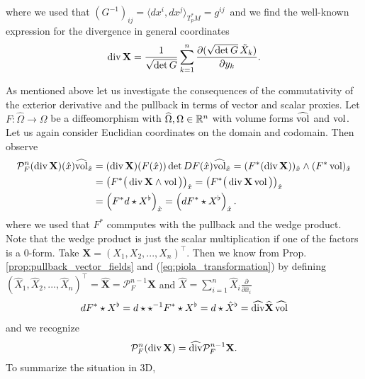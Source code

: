\documentclass[../main.tex]{subfiles}
\begin{document}
where we used that $(G^{-1})_{ij} = \langle dx^i, dx^j \rangle_{T^*_p M} = g^{ij}$\
and we find the well-known expression for the divergence in general coordinates
\begin{align*}
    \operatorname{div} \mathbf{X} = \frac{1}{\sqrt{ \det G}} \sum_{k=1}^n 
        \frac{\partial (\sqrt{ \det G} \, \tilde{X}_k )}{\partial y_k}.
\end{align*}

As mentioned above let us investigate the consequences of the 
commutativity of the exterior derivative and the pullback in terms 
of vector and scalar proxies.
Let $F: \widehat{\Omega} \rightarrow \Omega$ be a diffeomorphism with 
$\widehat{\Omega}, \Omega \in \mathbb{R}^n$ with volume forms $\widehat{\operatorname{vol}}$ and 
$\operatorname{vol}$. Let us again consider Euclidian 
coordinates on the domain and codomain. Then observe
\begin{align*}
    \mathcal{P}^n_F (\operatorname{div} \mathbf{X})(\hat{x}) \widehat{\operatorname{vol}}_{\hat{x}}
    &= (\operatorname{div} \mathbf{X})(F(\hat{x}))  \det DF(\hat{x}) \widehat{\operatorname{vol}}_{\hat{x}} 
    = ( F^* (\operatorname{div} \mathbf{X}))_{\hat{x}} \wedge (F^* \operatorname{vol})_{\hat{x}}
    \\ &= \left( F^* \big( \operatorname{div} \mathbf{X} \wedge \operatorname{vol} \big) \right)_{\hat{x}}
    =  \left( F^* \big( \operatorname{div} \mathbf{X} \operatorname{vol} \big) \right)_{\hat{x}}
    \\ &= \left( F^* d \star X^\flat  \right)_{\hat{x}}
    = \left( d F^* \star X^\flat  \right)_{\hat{x}}.
\end{align*}
where we used that $F^*$ commputes with the pullback and the 
wedge product. Note that the wedge product is just the scalar multiplication 
if one of the factors is a $0$-form. Take $\mathbf{X} = (X_1, X_2, ..., X_n)^\top$. 
Then we know from Prop.\,\ref{prop:pullback_vector_fields} and (\ref{eq:piola_transformation})
by defining $(\hat{X}_1, \hat{X}_2, ..., \hat{X}_n)^\top = \mathbf{\hat{X}} = \mathcal{P}^{n-1}_F \mathbf{X}$
and $\hat{X} = \sum_{i=1}^n \hat{X}_i \frac{\partial}{\partial \hat{x}_i}$
\begin{align*}
    d F^* \star X^\flat = d \star \star^{-1} F^* \star X^\flat 
    = d \star \hat{X}^\flat = \widehat{\operatorname{div}} \mathbf{\widehat{X}} \, \widehat{\operatorname{vol}}
\end{align*}
and we recognize 
\begin{align*}
    \mathcal{P}^{n}_F (\operatorname{div} \mathbf{X}) = \widehat{\operatorname{div}} \mathcal{P}^{n-1}_F \mathbf{X}.
\end{align*}
To summarize the situation in 3D,
\end{document}
